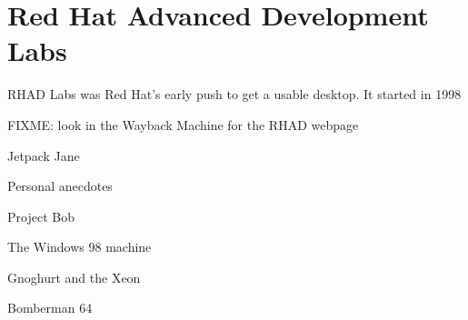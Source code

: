 \chapter{Red Hat Advanced Development Labs}

RHAD Labs was Red Hat's early push to get a usable desktop.  It
started in 1998

FIXME: look in the Wayback Machine for the RHAD webpage

Jetpack Jane

Personal anecdotes

Project Bob

The Windows 98 machine

Gnoghurt and the Xeon

Bomberman 64
